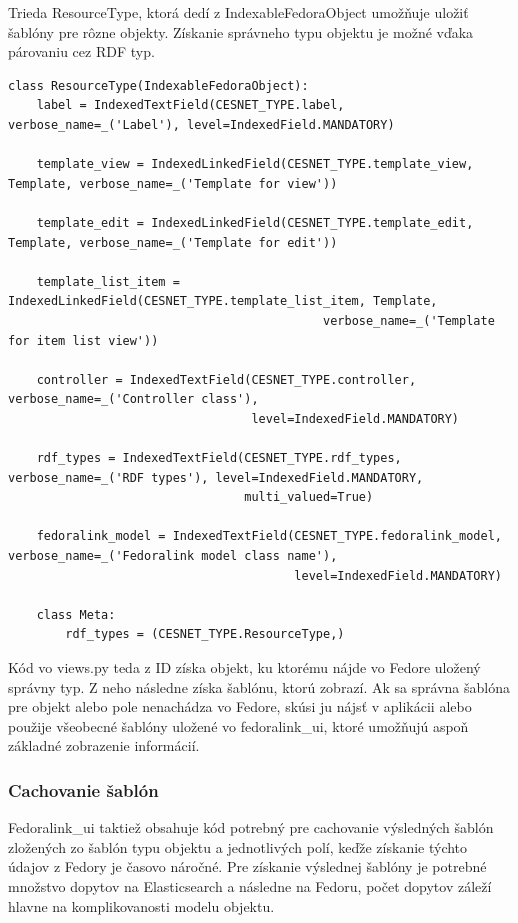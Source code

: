 \documentclass[thesis=M,slovak]{FITthesis}[2013/05/06]
\begin{document}
Trieda ResourceType, ktorá dedí z IndexableFedoraObject umožňuje uložiť šablóny pre rôzne objekty. Získanie správneho typu objektu je možné vďaka párovaniu cez RDF typ.
\begin{lstlisting}[frame=single] 
class ResourceType(IndexableFedoraObject):
    label = IndexedTextField(CESNET_TYPE.label, verbose_name=_('Label'), level=IndexedField.MANDATORY)

    template_view = IndexedLinkedField(CESNET_TYPE.template_view, Template, verbose_name=_('Template for view'))

    template_edit = IndexedLinkedField(CESNET_TYPE.template_edit, Template, verbose_name=_('Template for edit'))

    template_list_item = IndexedLinkedField(CESNET_TYPE.template_list_item, Template,
                                            verbose_name=_('Template for item list view'))

    controller = IndexedTextField(CESNET_TYPE.controller, verbose_name=_('Controller class'),
                                  level=IndexedField.MANDATORY)

    rdf_types = IndexedTextField(CESNET_TYPE.rdf_types, verbose_name=_('RDF types'), level=IndexedField.MANDATORY,
                                 multi_valued=True)

    fedoralink_model = IndexedTextField(CESNET_TYPE.fedoralink_model, verbose_name=_('Fedoralink model class name'),
                                        level=IndexedField.MANDATORY)

    class Meta:
        rdf_types = (CESNET_TYPE.ResourceType,)
\end{lstlisting}

Kód vo views.py teda z ID získa objekt, ku ktorému nájde vo Fedore uložený správny typ. Z neho následne získa šablónu, ktorú zobrazí. Ak sa správna šablóna pre objekt alebo pole nenachádza vo Fedore, skúsi ju nájsť v aplikácii alebo použije všeobecné šablóny uložené vo fedoralink\_ui, ktoré umožňujú aspoň základné zobrazenie informácií.

\subsubsection{Cachovanie šablón}
Fedoralink\_ui taktiež obsahuje kód potrebný pre cachovanie výsledných šablón zložených zo šablón typu objektu a jednotlivých polí, keďže získanie týchto údajov z Fedory je časovo náročné. Pre získanie výslednej šablóny je potrebné množstvo dopytov na Elasticsearch a následne na Fedoru, počet dopytov záleží hlavne na komplikovanosti modelu objektu.
\end{document}
